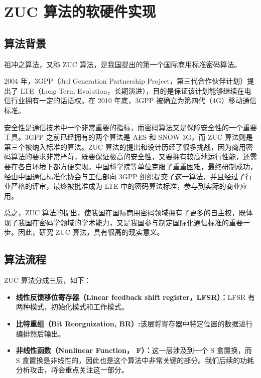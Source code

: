 
\chapter{ZUC 算法的软硬件实现}

\label{chap:zuc}

\section{算法背景} %
祖冲之算法，又称 ZUC 算法，是我国提出的第一个国际商用标准密码算法。

2004 年，3GPP（3rd Generation Partnership Project，第三代合作伙伴计划）提出了 LTE（Long Term Evolution，长期演进），目的是保证该计划能够继续在电信行业拥有一定的话语权。在 2010 年底，3GPP 被确立为第四代（4G）移动通信标准。 \cite{lte}

安全性是通信技术中一个非常重要的指标，而密码算法又是保障安全性的一个重要工具。3GPP 之前已经拥有的两个算法是 AES 和 SNOW 3G，而 ZUC 算法则是第三个被纳入标准的算法。ZUC 算法的提出和设计历经了很多挑战，因为商用密码算法的要求非常严苛，既要保证极高的安全性，又要拥有较高地运行性能，还需要在各自环境下都方便实现。中国科学院等单位克服了重重困难，最终研制成功，经由中国通信标准化协会与工信部向 3GPP 组织提交了这一算法，并且经过了行业严格的评审，最终被批准成为 LTE 中的密码算法标准，参与到实际的商业应用。 \cite{zuc_test}

总之，ZUC 算法的提出，使我国在国际商用密码领域拥有了更多的自主权，既体现了我国在密码学领域的学术能力，又是我国参与制定国际化通信标准的重要一步。因此，研究 ZUC 算法，具有很高的现实意义。

\section{算法流程}
\label{sec:algoflow}

ZUC 算法分成三层，如下： \cite{zuc_standard}

\begin{itemize}
    \item \textbf{线性反馈移位寄存器（Linear feedback shift register，LFSR）：}LFSR 有两种模式，初始化模式和工作模式。
    \item \textbf{比特重组（Bit Reorgnization, BR）:}该层将寄存器中特定位置的数据进行编排然后输出。
    \item \textbf{非线性函数（Nonlinear Function， F）：}这一层涉及到一个 S 盒置换，而 S 盒置换是非线性的，因此也是这个算法中非常关键的部分。我们后续的功耗分析攻击，将会重点关注这一部分。
\end{itemize}

